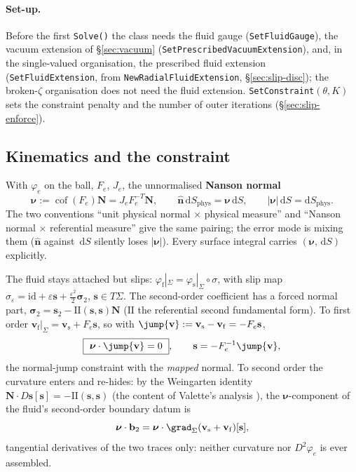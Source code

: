 \documentclass[11pt]{article}
\numberwithin{equation}{section}
\theoremstyle{remark}
\newcommand{\eps}{\varepsilon}
\newcommand{\dS}{\,\mathrm{d}S}
\newcommand{\cof}{\operatorname{cof}}
\newcommand{\vv}{\mathbf{v}}
\newcommand{\vn}{\hat{\mathbf{n}}}
\newcommand{\vN}{\mathbf{N}}
\newcommand{\vs}{\mathbf{s}}
\newcommand{\bnu}{\bm{\nu}}
\newcommand{\code}[1]{\texttt{#1}}
\begin{document}
\paragraph{Set-up.} Before the first \code{Solve()} the class needs the
fluid gauge (\code{SetFluidGauge}), the vacuum extension of
\S\ref{sec:vacuum} (\code{SetPrescribedVacuumExtension}), and, in the
single-valued organisation, the prescribed fluid extension
(\code{SetFluidExtension}, from \code{NewRadialFluidExtension},
\S\ref{sec:slip-disc}); the broken-$\zeta$ organisation does not need the
fluid extension. \code{SetConstraint}$(\theta, K)$ sets the constraint
penalty and the number of outer iterations (\S\ref{sec:slip-enforce}).

\subsection{Kinematics and the constraint}

With $\varphi_e$ on the ball, $F_e$, $J_e$, the unnormalised \textbf{Nanson
normal}
\begin{equation}
  \bnu := \cof(F_e)\vN = J_eF_e^{-T}\vN, \qquad
  \vn\,\mathrm{d}S_{\mathrm{phys}} = \bnu\dS, \qquad
  |\bnu|\dS = \mathrm{d}S_{\mathrm{phys}} .
\end{equation}
The two conventions ``unit physical normal $\times$ physical measure'' and
``Nanson normal $\times$ referential measure'' give the same pairing; the
error mode is mixing them ($\vn$ against $\dS$ silently loses $|\bnu|$).
Every surface integral carries $(\bnu,\dS)$ explicitly.

The fluid stays attached but slips: $\varphi_{\mathrm{f}}|_\Sigma =
\varphi_{\mathrm{s}}|_\Sigma\circ\sigma$, with slip map $\sigma_\eps =
\mathrm{id} + \eps\vs + \tfrac{\eps^2}{2}\bm{\sigma}_2$, $\vs\in T\Sigma$.
The second-order coefficient has a forced normal part,
$\bm{\sigma}_2 = \vs_2 - \mathrm{II}(\vs,\vs)\vN$ ($\mathrm{II}$ the
referential second fundamental form). To first order $\vv_{\mathrm{f}}
|_\Sigma = \vv_{\mathrm{s}} + F_e\vs$, so with $\jump{\vv} :=
\vv_{\mathrm{s}} - \vv_{\mathrm{f}} = -F_e\vs$,
\begin{equation}
  \boxed{\ \bnu\cdot\jump{\vv} = 0\ }, \qquad \vs = -F_e^{-1}\jump{\vv},
  \label{eq:constraint}
\end{equation}
the normal-jump constraint with the \emph{mapped} normal. To second order
the curvature enters and re-hides: by the Weingarten identity
$\vN\cdot D\vs[\vs] = -\mathrm{II}(\vs,\vs)$ (the content of Valette's analysis
\cite{Valette1986}), the $\bnu$-component of the fluid's
second-order boundary datum is
\begin{equation}
  \bnu\cdot\mathbf{b}_2 = \bnu\cdot\grad_\Sigma(\vv_{\mathrm{s}}
     + \vv_{\mathrm{f}})[\vs],
\end{equation}
tangential derivatives of the two traces only: neither curvature nor
$D^2\varphi_e$ is ever assembled.
\end{document}
